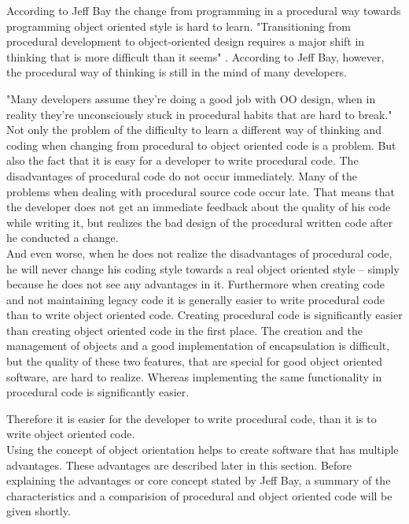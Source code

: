 According to Jeff Bay the change from programming in a procedural way towards programming object oriented style is hard to learn. "Transitioning from procedural development to object-oriented design requires a major shift in thinking that is more difficult than it seems" \cite[p. 70]{bay2008}. 
According to Jeff Bay, however, the procedural way of thinking is still in the mind of many developers.

"Many developers assume they’re doing a good job with OO design, when in reality they’re unconsciously
stuck in procedural habits that are hard to break." \cite[p. 70]{bay2008} Not only the problem of the difficulty to learn a different way of thinking and coding when changing from procedural to object oriented code is a problem. But also the fact that it is easy for a developer to write procedural code. The disadvantages of procedural code do not occur immediately. Many of the problems when dealing with procedural source code occur late. That means that the developer does not get an immediate feedback about the quality of his code while writing it, but realizes the bad design of the procedural written code after he conducted a change. \\
And even worse, when he does not realize the disadvantages of procedural code, he will never change his coding style towards a real object oriented style -- simply because he does not see any advantages in it. Furthermore when creating code and not maintaining legacy code it is generally easier to write procedural code than to write object oriented code. Creating procedural code is significantly easier than creating object oriented code in the first place. The creation and the management of objects and a good implementation of encapsulation is difficult, but the quality of these two features, that are special for good object oriented software, are hard to realize. Whereas implementing the same functionality in procedural code is significantly easier.

Therefore it is easier for the developer to write procedural code, than it is to write object oriented code. \\

Using the concept of object orientation helps to create software that has multiple advantages. These advantages are described later in this section. Before explaining the advantages or core concept stated by Jeff Bay, a summary of the characteristics and a comparision of procedural and object oriented code will be given shortly. \\


